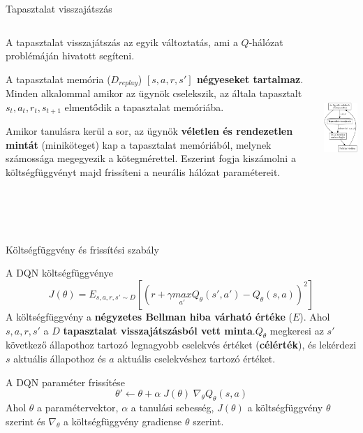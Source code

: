 \documentclass[english, aspectratio=169]{beamer}
\begin{document}
\begin{frame}{Tapasztalat visszajátszás}
\begin{columns}
\begin{column}{.65\textwidth}
A tapasztalat visszajátszás az egyik változtatás, ami a $Q$-hálózat problémáján hivatott segíteni.\par\smallskip
A tapasztalat memória ($D_{replay}$) \textbf{$[s,a,r,s']$ négyeseket tartalmaz}. Minden alkalommal amikor az ügynök cselekszik, az általa tapasztalt $s_t, a_t, r_t, s_{t+1}$ elmentődik a tapasztalat memóriába.\par\smallskip
Amikor tanulásra kerül a sor, az ügynök \textbf{véletlen és rendezetlen mintát} (miniköteget) kap a tapasztalat memóriából, melynek számossága megegyezik a kötegmérettel. Eszerint fogja kiszámolni a költségfüggvényt majd frissíteni a neurális hálózat paramétereit.
\end{column}
\begin{column}{.35\textwidth}
\begin{center}
\includegraphics[height=7cm, keepaspectratio]{graphs/ql_4.png}
\end{center}
\end{column}
\end{columns}
\end{frame}

\begin{frame}{Költségfüggvény és frissítési szabály}
\begin{block}{A DQN költségfüggvénye}
\[
J(\theta) = E_{s,a,r,s' \sim D} \left[ \left( r + \gamma \underset{a'}{max} Q_\theta(s',a') - Q_\theta(s,a) \right)^2 \right]
\]
A költségfüggvény a \textbf{négyzetes Bellman hiba várható értéke} ($E$). Ahol $s,a,r,s'$ a $D$ \textbf{tapasztalat visszajátszásból vett minta}.$Q_\theta$ megkeresi az $s'$ következő állapothoz tartozó legnagyobb cselekvés értéket (\textbf{célérték}), és lekérdezi $s$ aktuális állapothoz és $a$ aktuális cselekvéshez tartozó értéket. 
\end{block}
\begin{block}{A DQN paraméter frissítése}
\[
\theta' \leftarrow \theta + \alpha \; J(\theta) \; \nabla_\theta Q_\theta(s,a)
\]
Ahol $\theta$ a paramétervektor, $\alpha$ a tanulási sebesség, $J(\theta)$ a költségfüggvény $\theta$ szerint és $\nabla_\theta$ a költségfüggvény gradiense $\theta$ szerint.
\end{block}
\end{frame}
\end{document}
